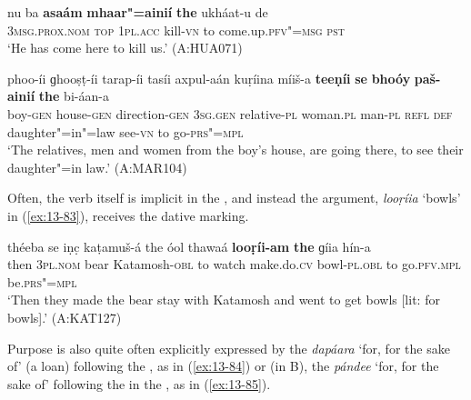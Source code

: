 \begin{exe}
\ex
\label{ex:13-81}
\gll nu ba \textbf{asaám} \textbf{mhaar"=ainií} \textbf{the} ukháat-u de\\
\textsc{3msg.prox.nom} \textsc{top} \textsc{1pl.acc} kill-\textsc{vn} to come.up.\textsc{pfv"=msg} \textsc{pst}\\
\glt `He has come here to kill us.' (A:HUA071)

\ex
\label{ex:13-82}
\gll phoo-íi ɡhooṣṭ-íi tarap-íi tasíi axpul-aán kuṛíina míiš-a \textbf{teeṇíi} \textbf{se} \textbf{bhoóy} \textbf{paš-ainií} \textbf{the} bi-áan-a \\
boy-\textsc{gen} house-\textsc{gen} direction-\textsc{gen} \textsc{3sg.gen} relative-\textsc{pl} woman.\textsc{pl}  man-\textsc{pl} \textsc{refl} \textsc{def} daughter"=in"=law see-\textsc{vn} to go-\textsc{prs"=mpl} \\
\glt `The relatives, men and women from the boy's house, are going there, to see their daughter"=in law.' (A:MAR104) 
\end{exe}

Often, the verb itself is implicit in the  , and instead the  argument, \textit{looṛíia} `bowls' in (\ref{ex:13-83}), receives the dative marking.

\begin{exe}
\ex
\label{ex:13-83}
\gll théeba se iṇc̣ kaṭamuš-á the óol thawaá \textbf{looṛíi-am} \textbf{the} ɡíia hín-a \\
then \textsc{3pl.nom} bear Katamosh-\textsc{obl} to watch  make.do.\textsc{cv} bowl-\textsc{pl.obl} to go.\textsc{pfv.mpl} be.\textsc{prs"=mpl} \\
\glt `Then they made the bear stay with Katamosh and went to get bowls [lit: for bowls].' (A:KAT127) 
\end{exe}

Purpose is also quite often explicitly expressed by the  \textit{dapáara} `for, for the sake of' (a \iliPashto loan) following the , as in (\ref{ex:13-84}) or (in B), the  \textit{pándee} `for, for the sake of' following the  in the , as in (\ref{ex:13-85}).

